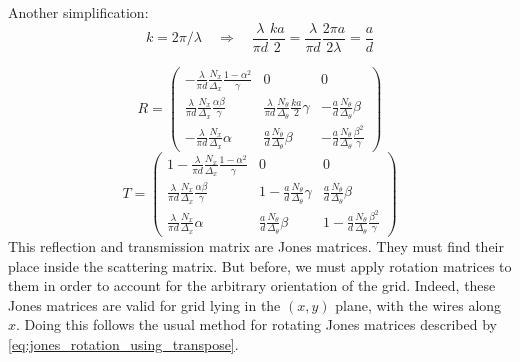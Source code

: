 Another simplification:
\begin{equation}
    k = 2\pi / \lambda
    \quad \Rightarrow \quad
    \frac{\lambda}{\pi d} \frac{ka}{2}
    =
    \frac{\lambda}{\pi d} \frac{2\pi a}{2\lambda}
    =
    \frac{a}{d}
\end{equation}

\begin{equation}
    R =
    \begin{pmatrix}
        -\frac{\lambda}{\pi d}
        \frac{N_x}{\Delta_x}
        \frac{1 - \alpha^2}{\gamma}
        &
        0
        &
        0
        \\
        \frac{\lambda}{\pi d}
        \frac{N_x}{\Delta_x}
        \frac{\alpha \beta}{\gamma}
        &
        \frac{\lambda}{\pi d}
        \frac{N_\theta}{\Delta_\theta}
        \frac{ka}{2}
        \gamma
        &
        -
        \frac{a}{d}
        \frac{N_\theta}{\Delta_\theta}
        \beta
        \\
        -
        \frac{\lambda}{\pi d}
        \frac{N_x}{\Delta_x}
        \alpha
        &
        \frac{a}{d}
        \frac{N_\theta}{\Delta_\theta}
        \beta
        &
        -
        \frac{a}{d}
        \frac{N_\theta}{\Delta_\theta}
        \frac{\beta^2}{\gamma}
    \end{pmatrix}
\end{equation}
\begin{equation}
    T =
    \begin{pmatrix}
        1 -
        \frac{\lambda}{\pi d}
        \frac{N_x}{\Delta_x}
        \frac{1 - \alpha^2}{\gamma}
        &
        0
        &
        0
        \\
        \frac{\lambda}{\pi d}
        \frac{N_x}{\Delta_x}
        \frac{\alpha \beta}{\gamma}
        &
        1 -
        \frac{a}{d}
        \frac{N_\theta}{\Delta_\theta}
        \gamma
        &
        \frac{a}{d}
        \frac{N_\theta}{\Delta_\theta}
        \beta
        \\
        \frac{\lambda}{\pi d}
        \frac{N_x}{\Delta_x}
        \alpha
        &
        \frac{a}{d}
        \frac{N_\theta}{\Delta_\theta}
        \beta
        &
        1 -
        \frac{a}{d}
        \frac{N_\theta}{\Delta_\theta}
        \frac{\beta^2}{\gamma}
    \end{pmatrix}
\end{equation}
This reflection and transmission matrix are Jones matrices.
They must find their place inside the scattering matrix.
But before, we must apply rotation matrices to them in order to account for the arbitrary orientation of the grid.
Indeed, these Jones matrices are valid for grid lying in the $(x, y)$ plane, with the wires along $x$.
Doing this follows the usual method for rotating Jones matrices described by \cref{eq:jones_rotation_using_transpose}.





